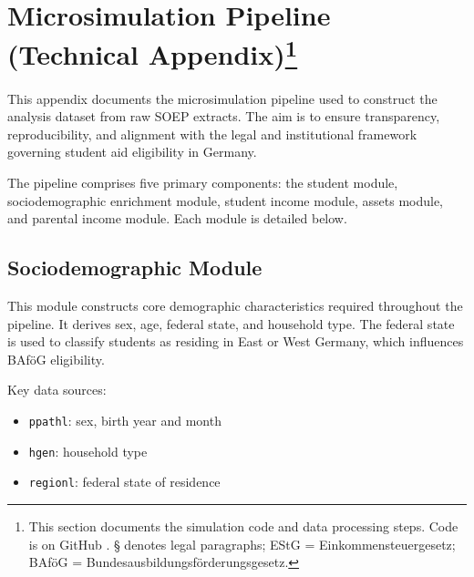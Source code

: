 
\newpage
\section[Microsimulation Appendix]{Microsimulation Pipeline (Technical Appendix)\footnote{
This section documents the simulation code and data processing steps. Code is on GitHub \cite{bystrom2025msc}. § denotes legal paragraphs; EStG = Einkommensteuergesetz; BAföG = Bundesausbildungsförderungsgesetz.}
}
\label{appendix:microsimulation-pipeline}

This appendix documents the microsimulation pipeline used to construct the analysis dataset from raw SOEP extracts. The aim is to ensure transparency, reproducibility, and alignment with the legal and institutional framework governing student aid eligibility in Germany.

The pipeline comprises five primary components: the student module, sociodemographic enrichment module, student income module, assets module, and parental income module.
Each module is detailed below.

\subsection{Sociodemographic Module}

This module constructs core demographic characteristics required throughout the pipeline. It derives sex, age, federal state, and household type. The federal state is used to classify students as residing in East or West Germany, which influences BAföG eligibility.

Key data sources:

\begin{itemize}
  \item \texttt{ppathl}: sex, birth year and month
  \item \texttt{hgen}: household type
  \item \texttt{regionl}: federal state of residence
\end{itemize}

